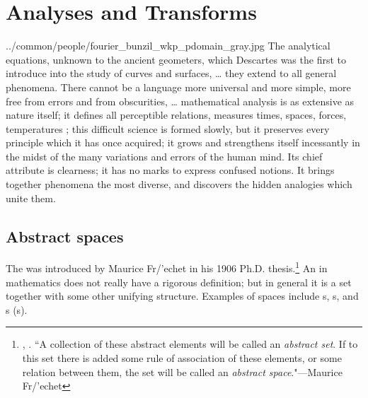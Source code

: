 ﻿%
\chapter{Analyses and Transforms}
  {../common/people/fourier_bunzil_wkp_pdomain_gray.jpg}
  {%
  The analytical equations, unknown to the ancient geometers, which Descartes was the first to introduce into the study of curves and surfaces, 
  \ldots %
  they extend to all general phenomena. 
  There cannot be a language more universal and more simple, 
  more free from errors and from obscurities, 
  \ldots
  mathematical analysis is as extensive as nature itself; 
  it defines all perceptible relations, measures times, spaces, forces, temperatures ; 
  this difficult science is formed slowly, but 
  it preserves every principle which it has once acquired; 
  it grows and strengthens itself incessantly in the midst of the many variations and errors of the human mind. 
  Its chief attribute is clearness; it has no marks to express confused notions. 
  It brings together phenomena the most diverse, and discovers the hidden analogies which unite them.
  }
\section{Abstract spaces}
The  was introduced by Maurice Fr/'echet in his 1906 Ph.D. thesis.\footnote{
  ,
  .
   {\fntquote``A collection of these abstract elements will be called an \emph{abstract set}.
   If to this set there is added some rule of association of these elements,
   or some relation between them,
   the set will be called an \emph{abstract space}."}---Maurice Fr/'echet
  }
An  in mathematics does not really have a rigorous definition;
but in general it is a set together with some other unifying structure.
Examples of spaces include s, s, and s 
(s).

